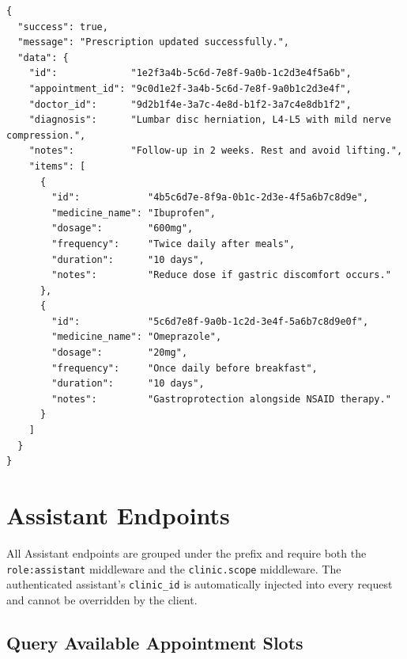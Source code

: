 \begin{lstlisting}[style=json]
{
  "success": true,
  "message": "Prescription updated successfully.",
  "data": {
    "id":             "1e2f3a4b-5c6d-7e8f-9a0b-1c2d3e4f5a6b",
    "appointment_id": "9c0d1e2f-3a4b-5c6d-7e8f-9a0b1c2d3e4f",
    "doctor_id":      "9d2b1f4e-3a7c-4e8d-b1f2-3a7c4e8db1f2",
    "diagnosis":      "Lumbar disc herniation, L4-L5 with mild nerve compression.",
    "notes":          "Follow-up in 2 weeks. Rest and avoid lifting.",
    "items": [
      {
        "id":            "4b5c6d7e-8f9a-0b1c-2d3e-4f5a6b7c8d9e",
        "medicine_name": "Ibuprofen",
        "dosage":        "600mg",
        "frequency":     "Twice daily after meals",
        "duration":      "10 days",
        "notes":         "Reduce dose if gastric discomfort occurs."
      },
      {
        "id":            "5c6d7e8f-9a0b-1c2d-3e4f-5a6b7c8d9e0f",
        "medicine_name": "Omeprazole",
        "dosage":        "20mg",
        "frequency":     "Once daily before breakfast",
        "duration":      "10 days",
        "notes":         "Gastroprotection alongside NSAID therapy."
      }
    ]
  }
}
\end{lstlisting}

\section{Assistant Endpoints}
\label{sec:ep-assistant}

All Assistant endpoints are grouped under the
 prefix and require both the
\texttt{role:assistant} middleware and the \texttt{clinic.scope}
middleware. The authenticated assistant's \texttt{clinic\_id} is
automatically injected into every request and cannot be overridden by
the client.

\subsection{Query Available Appointment Slots}
\label{ep:assistant-available-slots}


